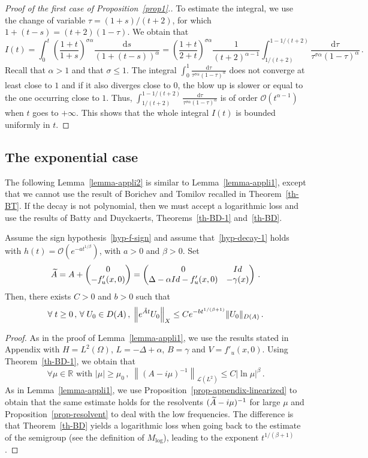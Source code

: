 \documentclass[AHL,Unicode,longabstracts]{cedram}
\newcommand{\RR}{\mathbb{R}}
\newcommand{\Lc}{\mathcal{L}}
\newcommand{\Oc}{\mathcal{O}}
\newcommand{\drm}{\mathrm{d}}
\let\oldtilde\tilde
\renewcommand*{\tilde}[1]{\mathchoice{\widetilde{#1}}{\widetilde{#1}}{\oldtilde{#1}}{\oldtilde{#1}}}\let\oldexists\exists
\renewcommand*{\exists}{\mathrel{\oldexists}}
\let\oldforall\forall
\renewcommand*{\forall}{\mathrel{\oldforall}}
\begin{document}
\begin{proof}[{Proof of the first case of Proposition~\ref{prop1}}.]
To estimate the integral, we use the change of variable $\tau = (1+s)/(t+2)$, for which $1+(t-s)=(t+2)(1-\tau)$. We obtain that
\[
I(t)=\int_0^t \left(\frac{1+t}{1+s}\right)^{\sigma\alpha}
\frac{\drm s}{(1+(t-s))^\alpha} = \left(\frac{1+t}{2+t}\right)^{\sigma\alpha}
\frac{1}{(t+2)^{\alpha-1}} \int_{1/(t+2)}^{1-1/(t+2)} \frac {\drm\tau}{\tau^{\sigma\alpha}(1-\tau)^\alpha}\,.
\]
Recall that $\alpha>1$ and that $\sigma \leq 1$. The integral $\int_0^1 \frac {\drm\tau}{\tau^{\sigma\alpha}(1-\tau)^\alpha}$ does not converge at least close to $1$ and if it also diverges close to $0$, the blow up is slower or equal to the one occurring close to $1$. Thus, $\int_{1/(t+2)}^{1-1/(t+2)} \frac {\drm\tau}{\tau^{\sigma\alpha}(1-\tau)^\alpha}$ is of order $\Oc(t^{\alpha-1})$ when $t$ goes to $+\infty$. This shows that the whole integral $I(t)$ is bounded uniformly in $t$. 
\end{proof}

\subsection{The exponential case}
The following Lemma~\ref{lemma-appli2} is similar to Lemma~\ref{lemma-appli1}, except that we cannot use the result of Borichev and Tomilov recalled in Theorem~\ref{th-BT}. If the decay is not polynomial, then we must accept a logarithmic loss and use the results of Batty and Duyckaerts, Theorems~\ref{th-BD-1} and~\ref{th-BD}.

\begin{lemma}\label{lemma-appli2}
Assume the sign hypothesis~\eqref{hyp-f-sign} and assume that~\eqref{hyp-decay-1} holds with $h(t)=\Oc(e^{-a t^{1/\beta}})$, with $a>0$ and $\beta>0$. Set
\[
\tilde A=A +
\begin{pmatrix}
 0 \\
-f'_u(x,0)
\end{pmatrix}=
\begin{pmatrix}
0 & Id\\
\Delta-\alpha Id-f'_u(x,0) & -\gamma(x)
\end{pmatrix}\,.
\]
Then, there exists $C>0$ and $b>0$ such that
\[
\forall t\geq 0\,,\,\forall U_0\in D(A)\,,\;\left\|e^{\tilde At} U_0\right\|_X \leq
Ce^{-b t^{1/(\beta+1)}} \|U_0\|_{D(A)}\,.
\]
\end{lemma}
\begin{proof}
As in the proof of Lemma~\ref{lemma-appli1}, we use the results stated in Appendix with $H=L^2(\Omega)$, $L=-\Delta+\alpha$, $B=\gamma$ and $V=f'_u(x,0)$. Using Theorem~\ref{th-BD-1}, we obtain that
\[
\forall \mu\in\RR\text{ with }|\mu|\geq
\mu_0\,,\;\left\|(A-i\mu)^{-1}\right\|_{\Lc(L^2)} \leq C {|\ln \mu|^{\beta}}\,.
\]
As in Lemma~\ref{lemma-appli1}, we use Proposition~\ref{prop-appendix-linearized} to obtain that the same estimate holds for the resolvents $(\tilde A-i\mu)^{-1}$ for large $\mu$ and Proposition~\ref{prop-resolvent} to deal with the low frequencies. The difference is that Theorem~\ref{th-BD} yields a logarithmic loss when going back to the estimate of the semigroup (see the definition of $M_{\text{log}}$), leading to the exponent $t^{1/(\beta+1)}$.
\end{proof}
\end{document}
